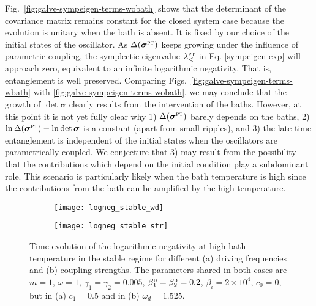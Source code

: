 \documentclass[11pt,a4paper]{article}
\begin{document}
Fig.~\ref{fig:galve-sympeigen-terms-wobath} shows that the determinant of the covariance matrix remains constant for the closed system case because the evolution is unitary when the bath is absent. It is fixed by our choice of the initial states of the oscillator. As $\Delta(\bm{\sigma}^{\textsc{pt}})$ keeps growing under the influence of parametric coupling, the symplectic eigenvalue $\lambda_{<}^{\textsc{pt}}$ in Eq. \eqref{sympeigen-exp} will approach zero, equivalent to an infinite logarithmic negativity. That is, entanglement is well preserved. Comparing Figs.~\ref{fig:galve-sympeigen-terms-wbath} with \ref{fig:galve-sympeigen-terms-wobath}, we may conclude that the growth of $\det \bm{\sigma}$ clearly results from the intervention of the baths. However, at this point it is not yet {fully} clear why 1) $\Delta(\bm{\sigma}^{\textsc{pt}})$ barely depends on the baths, 2) $\ln\Delta(\bm{\sigma}^{\textsc{pt}})-\ln\det \bm{\sigma}$ is a constant (apart from small ripples), and 3) the late-time entanglement is independent of the initial states when the oscillators are parametrically coupled. {We conjecture that 3) may result from the possibility that the contributions which depend on the initial condition play a subdominant role.} This scenario is particularly likely when the bath temperature is high {since the contributions from the bath can be amplified by the high temperature}.


\begin{figure}
  	\begin{subfigure}{0.49\textwidth}
     	\texttt{[image: logneg\_stable\_wd]}     
     	\caption{}
		\label{fig:stable-wd} 
	\end{subfigure}
 	\hfill
	\begin{subfigure}{0.49\textwidth}
     	\texttt{[image: logneg\_stable\_str]}
     	\caption{}
		\label{fig:stable-str} 
	\end{subfigure}
	\caption{Time evolution of the logarithmic negativity at high bath temperature in the stable regime for different (a) driving frequencies and (b) coupling strengths. The parameters shared in both cases are $m = 1$,  $\omega = 1$, $\gamma_{1}=\gamma_{2}= 0.005$, $\beta^{\textsc{b}}_{1}=\beta^{\textsc{b}}_{2}= 0.2$, $\beta_i = 2\times 10^4$, $c_0 = 0$, but in (a) $c_1 = 0.5$ and in (b) $\omega_d = 1.525$.}
	\label{Fi:ebgtsd}
\end{figure}
\end{document}
